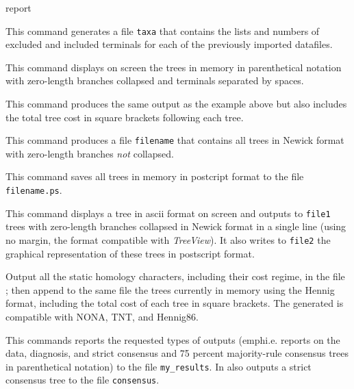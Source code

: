 \begin{command}{report}{}
\begin{poyexamples}
		{This command generates a file \texttt{taxa} that contains the
		lists and numbers of excluded and included terminals for each of the previously
		imported datafiles.}
		
            {This command displays on screen the trees in memory in parenthetical
            notation with zero-length branches collapsed and terminals
            separated by spaces.}

            {This command produces the same output as the example above
            but also includes the total tree cost in square brackets
            following each tree.}

            {This command produces a file \texttt{filename} that contains
            all trees in Newick format with zero-length branches \emph{not}
            collapsed.}
		
            {This command saves all trees in memory in
            postcript format to the file \texttt{filename.ps}.}

		{This command displays a tree in ascii format on screen and outputs
		to \texttt{file1} trees with zero-length branches collapsed in Newick format
		in a single line (using no margin, the format compatible with \emph{TreeView}). It
		also writes to \texttt{file2} the graphical representation of these trees in
		postscript format.}

            {Output all the static homology characters, including their cost
            regime, in the file ; then append to the same
            file the trees currently in memory using the Hennig format, 
            including the total cost of each tree in square brackets. The
            generated  is compatible with NONA, TNT, and
            Hennig86.
             }
            
         {This commands reports the requested types of outputs (emph{i.e.}
        reports on the data, diagnosis, and strict consensus and 75 percent
         majority-rule consensus trees in parenthetical notation) to the file
         \texttt{my\_results}. In also outputs a strict consensus tree to the file
         \texttt{consensus}.}
         

\end{poyexamples}
\end{command}
